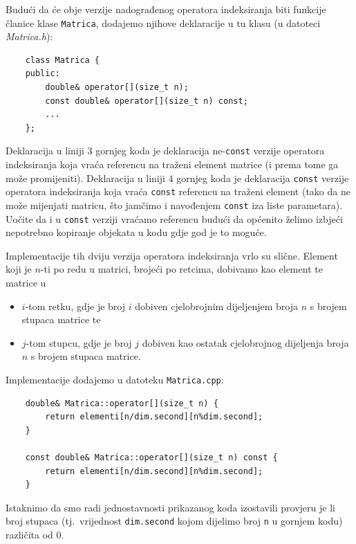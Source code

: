 \begin{rjesenje}
    Budući da će obje verzije nadograđenog operatora
    indeksiranja biti funkcije članice klase \texttt{Matrica}, dodajemo
    njihove deklaracije u tu klasu (u datoteci \textit{Matrica.h}):

    \begin{verbatim}    
    class Matrica {
    public:
        double& operator[](size_t n);
        const double& operator[](size_t n) const;
        ...
    };
    \end{verbatim}

    Deklaracija u liniji 3 gornjeg koda je deklaracija ne-\texttt{const} verzije
    operatora indeksiranja
    koja vraća referencu na traženi element matrice
    (i prema tome ga može promijeniti).
    Deklaracija u liniji 4 gornjeg koda je deklaracija
    \texttt{const} verzije operatora indeksiranja
    koja vraća \texttt{const} referencu na traženi element
    (tako da ne može mijenjati matricu, što jamčimo i navođenjem \texttt{const} iza liste parametara).
    Uočite da i u \texttt{const} verziji vraćamo referencu
    budući da općenito želimo izbjeći nepotrebno kopiranje objekata u kodu gdje god je to moguće.
    \medskip

    Implementacije tih dviju verzija operatora indeksiranja vrlo su slične.
    Element koji je $n$-ti po redu u matrici, brojeći po retcima,
    dobivamo kao element te matrice u 
    \begin{itemize}
        \item 
        $i$-tom retku, gdje je broj $i$ dobiven cjelobrojnim dijeljenjem broja $n$ s brojem stupaca matrice te
        \item 
        $j$-tom stupcu, gdje je broj $j$ dobiven kao ostatak cjelobrojnog dijeljenja broja $n$ s brojem stupaca matrice. 
    \end{itemize}
    Implementacije dodajemo u datoteku \texttt{Matrica.cpp}:
    \begin{verbatim}    
    double& Matrica::operator[](size_t n) {
        return elementi[n/dim.second][n%dim.second];
    }

    const double& Matrica::operator[](size_t n) const {
        return elementi[n/dim.second][n%dim.second];
    }
    \end{verbatim}
    Istaknimo da smo radi jednostavnosti prikazanog koda izostavili
    provjeru je li broj stupaca
    (tj.\ vrijednost \texttt{dim.second} kojom dijelimo broj \texttt{n} u gornjem kodu)
    različita od $0$.
\end{rjesenje}


